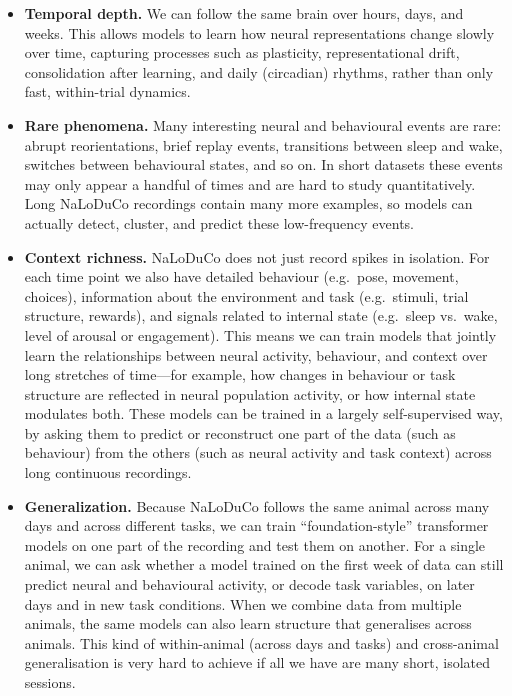 \begin{itemize}
  \item \textbf{Temporal depth.}
  We can follow the same brain over hours, days, and weeks.
  This allows models to learn how neural representations change slowly over time, capturing
  processes such as plasticity, representational drift, consolidation after learning, and daily
  (circadian) rhythms, rather than only fast, within-trial dynamics.

  \item \textbf{Rare phenomena.}
  Many interesting neural and behavioural events are rare: abrupt reorientations, brief replay
  events, transitions between sleep and wake, switches between behavioural states, and so on.
  In short datasets these events may only appear a handful of times and are hard to study
  quantitatively. Long NaLoDuCo recordings contain many more examples, so models can
  actually detect, cluster, and predict these low-frequency events.

  \item \textbf{Context richness.}
  NaLoDuCo does not just record spikes in isolation.
  For each time point we also have detailed behaviour (e.g.\ pose, movement, choices),
  information about the environment and task (e.g.\ stimuli, trial structure, rewards),
  and signals related to internal state (e.g.\ sleep vs.\ wake, level of arousal or engagement).
  This means we can train models that jointly learn the relationships between neural activity,
  behaviour, and context over long stretches of time---for example, how changes in behaviour
  or task structure are reflected in neural population activity, or how internal state modulates
  both. These models can be trained in a largely self-supervised way, by asking them to predict
  or reconstruct one part of the data (such as behaviour) from the others (such as neural
  activity and task context) across long continuous recordings.

  \item \textbf{Generalization.}
  Because NaLoDuCo follows the same animal across many days and across different tasks,
  we can train ``foundation-style'' transformer models on one part of the recording and test
  them on another. For a single animal, we can ask whether a model trained on the first week
  of data can still predict neural and behavioural activity, or decode task variables, on later
  days and in new task conditions. When we combine data from multiple animals, the same
  models can also learn structure that generalises across animals. This kind of within-animal
  (across days and tasks) and cross-animal generalisation is very hard to achieve if all we have
  are many short, isolated sessions.


\end{itemize}
